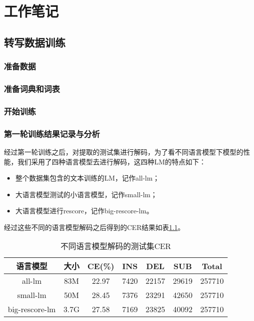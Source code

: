 \chapter{工作笔记}
\section{转写数据训练}
\subsection{准备数据}

\subsection{准备词典和词表}

\subsection{开始训练}

\subsection{第一轮训练结果记录与分析}
经过第一轮训练之后，对提取的测试集进行解码，为了看不同语言模型下模型的性能，我们采用了四种语言模型去进行解码，这四种LM的特点如下：
\begin{itemize}
	\item 整个数据集包含的文本训练的LM，记作all-lm；
	\item 大语言模型测试的小语言模型，记作small-lm；
	\item 大语言模型进行rescore，记作big-rescore-lm。
\end{itemize}

经过这些不同的语言模型解码之后得到的CER结果如表\ref{tab:lm-decoder}。
\begin{table}[h]
 \centering
 \caption{不同语言模型解码的测试集CER}
	 \begin{tabular*}{1\textwidth}{@{\extracolsep{\fill}}ccccccc}
	 \toprule
		{\bf 语言模型} & {\bf 大小} & {\bf CE(\%)} &{\bf INS} &{\bf DEL}  &{\bf SUB} &{\bf Total}\\
	 \midrule
	   all-lm         &  83M   & 22.97   &   7420 &  22157  & 29619  & 257710 \\
	   small-lm       &  50M   & 28.45   &  7376  &   23291 & 42650  & 257710 \\
	   big-rescore-lm &  3.7G  & 27.58   & 7169   &   23825 & 40092  & 257710 \\
	 \bottomrule
	 \end{tabular*}%
 \label{tab:lm-decoder}%
\end{table}%


